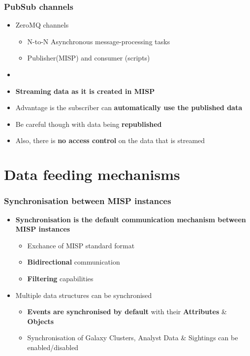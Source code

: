 \begin{frame}
    \frametitle{PubSub channels}
    \begin{itemize}
        \item ZeroMQ channels
        \begin{itemize}
            \item N-to-N Asynchronous message-processing tasks
            \item Publisher(MISP) and consumer (scripts)
        \end{itemize}
        \item []
        \item \textbf{Streaming data as it is created in MISP}
        \item Advantage is the subscriber can \textbf{automatically use the published data}
        \item Be careful though with data being \textbf{republished}
        \item Also, there is \textbf{no access control} on the data that is streamed
    \end{itemize}
\end{frame}

\section{Data feeding mechanisms}

\begin{frame}
    \frametitle{Synchronisation between MISP instances}
    \begin{itemize}
        \item \textbf{Synchronisation is the default communication mechanism between MISP instances}
        \begin{itemize}
            \item Exchance of MISP standard format
            \item \textbf{Bidirectional} communication
            \item \textbf{Filtering} capabilities
        \end{itemize}
        \item Multiple data structures can be synchronised
        \begin{itemize}
            \item \textbf{Events are synchronised by default} with their \textbf{Attributes} \& \textbf{Objects}
            \item Synchronisation of Galaxy Clusters, Analyst Data \& Sightings can be enabled/disabled
        \end{itemize}
    \end{itemize}
\end {frame}

